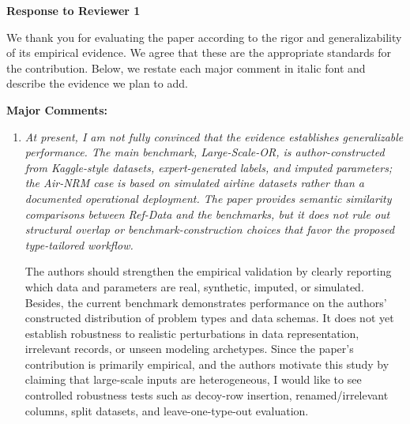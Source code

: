 \documentclass[11pt]{article}
\newcommand{\edit}[1]{{\color{hopkins-blue}\itshape #1}}
\newcommand{\planned}{\noindent\underline{\textbf{Planned response}}:\ }
\begin{document}
\begin{enumerate}[label=(AssoE.\arabic*),leftmargin=*]
\newpage
\begin{center}
{\LARGE\textbf{Response to Reviewer 1}}
\end{center}

We thank you for evaluating the paper according to the rigor and generalizability of its empirical evidence. We agree that these are the appropriate standards for the contribution. Below, we restate each major comment in italic font and describe the evidence we plan to add.

\noindent\textbf{Major Comments:}

\begin{enumerate}[label=(R1.Major.\arabic*),leftmargin=*]

\item \edit{At present, I am not fully convinced that the evidence establishes generalizable performance. The main benchmark, Large-Scale-OR, is author-constructed from Kaggle-style datasets, expert-generated labels, and imputed parameters; the Air-NRM case is based on simulated airline datasets rather than a documented operational deployment. The paper provides semantic similarity comparisons between Ref-Data and the benchmarks, but it does not rule out structural overlap or benchmark-construction choices that favor the proposed type-tailored workflow.

The authors should strengthen the empirical validation by clearly reporting which data and parameters are real, synthetic, imputed, or simulated. Besides, the current benchmark demonstrates performance on the authors' constructed distribution of problem types and data schemas. It does not yet establish robustness to realistic perturbations in data representation, irrelevant records, or unseen modeling archetypes. Since the paper's contribution is primarily empirical, and the authors motivate this study by claiming that large-scale inputs are heterogeneous, I would like to see controlled robustness tests such as decoy-row insertion, renamed/irrelevant columns, split datasets, and leave-one-type-out evaluation.}\label{R1-major-1}






\end{enumerate}
\end{enumerate}
\end{document}
